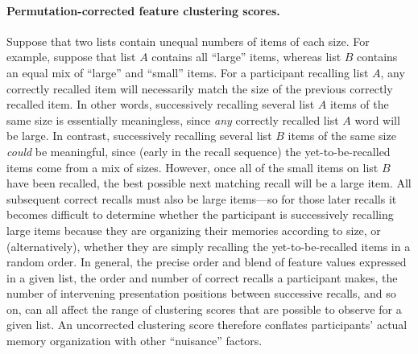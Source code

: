 \documentclass[11pt]{article}
\begin{document}
\paragraph*{Permutation-corrected feature clustering scores.}

Suppose that two lists contain unequal numbers of items of each size. For
example, suppose that list $A$ contains all ``large'' items, whereas list $B$
contains an equal mix of ``large'' and ``small'' items. For a participant
recalling list $A$, any correctly recalled item will necessarily match the size
of the previous correctly recalled item. In other words, successively recalling
several list $A$ items of the same size is essentially meaningless, since
\textit{any} correctly recalled list $A$ word will be large. In contrast,
successively recalling several list $B$ items of the same size \textit{could}
be meaningful, since (early in the recall sequence) the yet-to-be-recalled
items come from a mix of sizes. However, once all of the small items on list
$B$ have been recalled, the best possible next matching recall will be a large
item. All subsequent correct recalls must also be large items---so for
those later recalls it becomes difficult to determine whether the participant
is successively recalling large items because they are organizing their
memories according to size, or (alternatively), whether they are simply
recalling the yet-to-be-recalled items in a random order. In general, the
precise order and blend of feature values expressed in a given list, the order
and number of correct recalls a participant makes, the number of intervening
presentation positions between successive recalls, and so on, can all affect
the range of clustering scores that are possible to observe for a given list.
An uncorrected clustering score therefore conflates participants' actual memory
organization with other ``nuisance'' factors.
\end{document}
